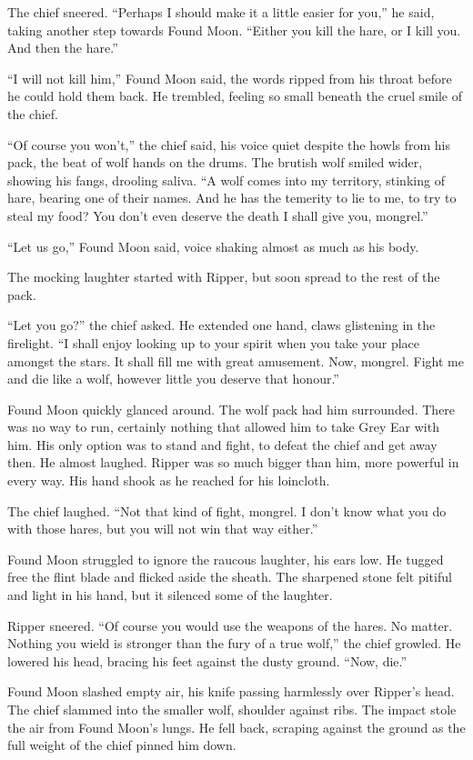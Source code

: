 The chief sneered. ``Perhaps I should make it a little easier for you,'' he said, taking another step towards Found Moon. ``Either you kill the hare, or I kill you. And then the hare.''

``I will not kill him,'' Found Moon said, the words ripped from his throat before he could hold them back. He trembled, feeling so small beneath the cruel smile of the chief.

``Of course you won't,'' the chief said, his voice quiet despite the howls from his pack, the beat of wolf hands on the drums. The brutish wolf smiled wider, showing his fangs, drooling saliva. ``A wolf comes into my territory, stinking of hare, bearing one of their names. And he has the temerity to lie to me, to try to steal my food? You don't even deserve the death I shall give you, mongrel.''

``Let us go,'' Found Moon said, voice shaking almost as much as his body.

The mocking laughter started with Ripper, but soon spread to the rest of the pack.

``Let you go?'' the chief asked. He extended one hand, claws glistening in the firelight. ``I shall enjoy looking up to your spirit when you take your place amongst the stars. It shall fill me with great amusement. Now, mongrel. Fight me and die like a wolf, however little you deserve that honour.''

Found Moon quickly glanced around. The wolf pack had him surrounded. There was no way to run, certainly nothing that allowed him to take Grey Ear with him. His only option was to stand and fight, to defeat the chief and get away then. He almost laughed. Ripper was so much bigger than him, more powerful in every way. His hand shook as he reached for his loincloth.

The chief laughed. ``Not that kind of fight, mongrel. I don't know what you do with those hares, but you will not win that way either.''

Found Moon struggled to ignore the raucous laughter, his ears low. He tugged free the flint blade and flicked aside the sheath. The sharpened stone felt pitiful and light in his hand, but it silenced some of the laughter.

Ripper sneered. ``Of course you would use the weapons of the hares. No matter. Nothing you wield is stronger than the fury of a true wolf,'' the chief growled. He lowered his head, bracing his feet against the dusty ground. ``Now, die.''

Found Moon slashed empty air, his knife passing harmlessly over Ripper's head. The chief slammed into the smaller wolf, shoulder against ribs. The impact stole the air from Found Moon's lungs. He fell back, scraping against the ground as the full weight of the chief pinned him down.

